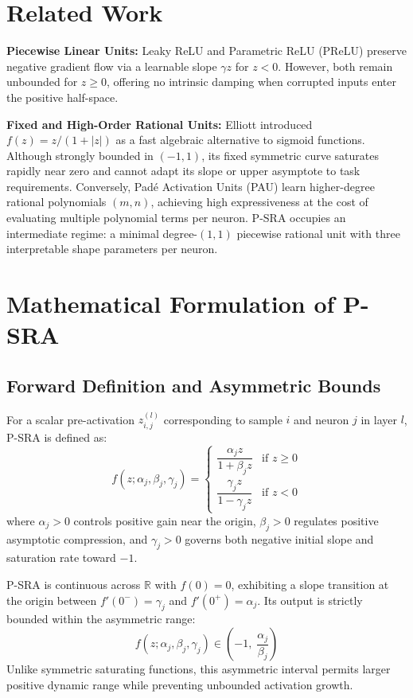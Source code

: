 \documentclass[conference]{IEEEtran}
\begin{document}
\section{Related Work}
\textbf{Piecewise Linear Units:} Leaky ReLU and Parametric ReLU (PReLU) \cite{he2015delving} preserve negative gradient flow via a learnable slope $\gamma z$ for $z < 0$. However, both remain unbounded for $z \ge 0$, offering no intrinsic damping when corrupted inputs enter the positive half-space.

\textbf{Fixed and High-Order Rational Units:} Elliott \cite{elliott1993better} introduced $f(z) = z / (1 + |z|)$ as a fast algebraic alternative to sigmoid functions. Although strongly bounded in $(-1, 1)$, its fixed symmetric curve saturates rapidly near zero and cannot adapt its slope or upper asymptote to task requirements. Conversely, Pad\'e Activation Units (PAU) \cite{molina2020pade} learn higher-degree rational polynomials $(m, n)$, achieving high expressiveness at the cost of evaluating multiple polynomial terms per neuron. P-SRA occupies an intermediate regime: a minimal degree-$(1,1)$ piecewise rational unit with three interpretable shape parameters per neuron.

\section{Mathematical Formulation of P-SRA}

\subsection{Forward Definition and Asymmetric Bounds}
For a scalar pre-activation $z_{i,j}^{(l)}$ corresponding to sample $i$ and neuron $j$ in layer $l$, P-SRA is defined as:
\begin{equation}
f\left(z; \alpha_j, \beta_j, \gamma_j\right) = 
\begin{cases} 
\dfrac{\alpha_j z}{1 + \beta_j z} & \text{if } z \ge 0 \\[12pt]
\dfrac{\gamma_j z}{1 - \gamma_j z} & \text{if } z < 0
\end{cases}
\label{eq:psra_forward}
\end{equation}
where $\alpha_j > 0$ controls positive gain near the origin, $\beta_j > 0$ regulates positive asymptotic compression, and $\gamma_j > 0$ governs both negative initial slope and saturation rate toward $-1$.

P-SRA is continuous across $\mathbb{R}$ with $f(0) = 0$, exhibiting a slope transition at the origin between $f'(0^-) = \gamma_j$ and $f'(0^+) = \alpha_j$. Its output is strictly bounded within the asymmetric range:
\begin{equation}
f(z; \alpha_j, \beta_j, \gamma_j) \in \left(-1,\; \frac{\alpha_j}{\beta_j}\right)
\end{equation}
Unlike symmetric saturating functions, this asymmetric interval permits larger positive dynamic range while preventing unbounded activation growth.
\end{document}
